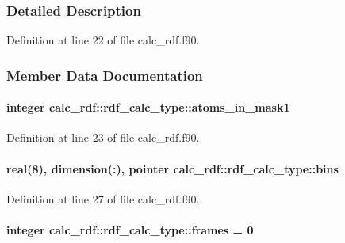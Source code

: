 \subsubsection{Detailed Description}


Definition at line 22 of file calc\-\_\-rdf.\-f90.



\subsubsection{Member Data Documentation}
\hypertarget{structcalc__rdf_1_1rdf__calc__type_af3686b01b44f3856a2e29100aca3072a}{
\paragraph[{atoms\-\_\-in\-\_\-mask1}]{\setlength{\rightskip}{0pt plus 5cm}integer calc\-\_\-rdf\-::rdf\-\_\-calc\-\_\-type\-::atoms\-\_\-in\-\_\-mask1}}\label{structcalc__rdf_1_1rdf__calc__type_af3686b01b44f3856a2e29100aca3072a}


Definition at line 23 of file calc\-\_\-rdf.\-f90.

\hypertarget{structcalc__rdf_1_1rdf__calc__type_aae2e9f8a47201e280073cdaa01deb044}{
\paragraph[{bins}]{\setlength{\rightskip}{0pt plus 5cm}real(8), dimension(\-:), pointer calc\-\_\-rdf\-::rdf\-\_\-calc\-\_\-type\-::bins}}\label{structcalc__rdf_1_1rdf__calc__type_aae2e9f8a47201e280073cdaa01deb044}


Definition at line 27 of file calc\-\_\-rdf.\-f90.

\hypertarget{structcalc__rdf_1_1rdf__calc__type_ac6bd6ce989b6106d94b1bbbe473dbc5d}{
\paragraph[{frames}]{\setlength{\rightskip}{0pt plus 5cm}integer calc\-\_\-rdf\-::rdf\-\_\-calc\-\_\-type\-::frames = 0}}\label{structcalc__rdf_1_1rdf__calc__type_ac6bd6ce989b6106d94b1bbbe473dbc5d}


